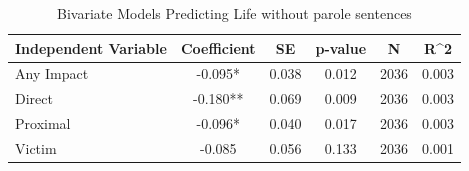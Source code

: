 \begin{table}

\caption{\label{tab:tab:prisonpen_5_bivariate}Bivariate Models Predicting Life without parole sentences}
\centering
\begin{tabular}[t]{lccccc}
\toprule
Independent Variable & Coefficient & SE & p-value & N & R\textasciicircum{}2\\
\midrule
Any Impact & -0.095* & 0.038 & 0.012 & 2036 & 0.003\\
Direct & -0.180** & 0.069 & 0.009 & 2036 & 0.003\\
Proximal & -0.096* & 0.040 & 0.017 & 2036 & 0.003\\
Victim & -0.085 & 0.056 & 0.133 & 2036 & 0.001\\
\bottomrule
\end{tabular}
\end{table}
